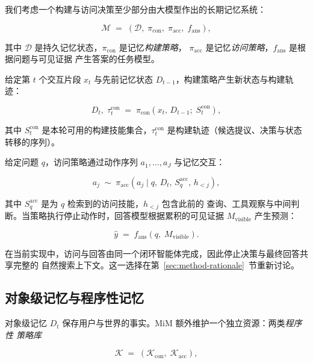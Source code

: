 \documentclass[UTF8,11pt]{ctexart}
\newcommand{\MM}{\mathcal{M}}
\newcommand{\DD}{\mathcal{D}}
\newcommand{\KK}{\mathcal{K}}
\begin{document}
我们考虑一个构建与访问决策至少部分由大模型作出的长期记忆系统：

\begin{equation}
\label{eq:system}
\MM \;=\; \left(\DD,\;\pi_{\mathrm{con}},\;\pi_{\mathrm{acc}},\;f_{\mathrm{ans}}\right),
\end{equation}

\noindent 其中 $\DD$ 是持久记忆状态，$\pi_{\mathrm{con}}$ 是记忆\emph{构建策略}，
$\pi_{\mathrm{acc}}$ 是记忆\emph{访问策略}，$f_{\mathrm{ans}}$ 是根据问题与可见证据
产生答案的任务模型。

给定第 $t$ 个交互片段 $x_t$ 与先前记忆状态 $D_{t-1}$，构建策略产生新状态与构建轨迹：

\begin{equation}
\label{eq:construction}
D_t,\;\tau_t^{\mathrm{con}} \;=\; \pi_{\mathrm{con}}\left(x_t,\,D_{t-1};\;S_t^{\mathrm{con}}\right),
\end{equation}

\noindent 其中 $S_t^{\mathrm{con}}$ 是本轮可用的构建技能集合，$\tau_t^{\mathrm{con}}$
是构建轨迹（候选提议、决策与状态转移的序列）。

给定问题 $q$，访问策略通过动作序列 $a_1,\dots,a_J$ 与记忆交互：

\begin{equation}
\label{eq:access}
a_j \;\sim\; \pi_{\mathrm{acc}}\left(a_j \mid q,\,D_t,\,S_q^{\mathrm{acc}},\,h_{<j}\right),
\end{equation}

\noindent 其中 $S_q^{\mathrm{acc}}$ 是为 $q$ 检索到的访问技能，$h_{<j}$ 包含此前的
查询、工具观察与中间判断。当策略执行停止动作时，回答模型根据累积的可见证据
$M_{\mathrm{visible}}$ 产生预测：

\begin{equation}
\label{eq:answer}
\hat{y} \;=\; f_{\mathrm{ans}}\left(q,\;M_{\mathrm{visible}}\right).
\end{equation}

在当前实现中，访问与回答由同一个闭环智能体完成，因此停止决策与最终回答共享完整的
自然搜索上下文。这一选择在第~\ref{sec:method-rationale}~节重新讨论。

\subsection{对象级记忆与程序性记忆}
\label{sec:prob-object}

对象级记忆 $D_t$ 保存用户与世界的事实。MiM 额外维护一个独立资源：两类\emph{程序性
策略库}

\begin{equation}
\label{eq:banks}
\KK \;=\; \left(\KK_{\mathrm{con}},\;\KK_{\mathrm{acc}}\right),
\end{equation}
\end{document}
